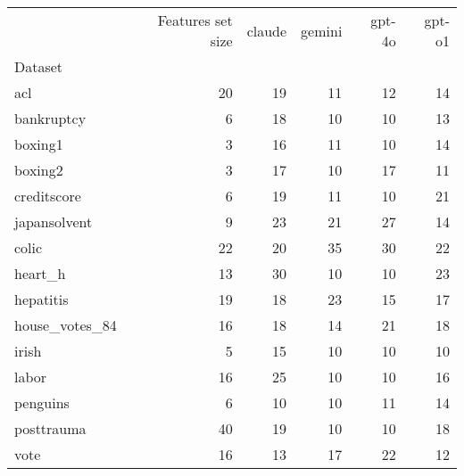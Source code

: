 \begin{tabular}{lrrrrr}
\toprule
 & Features set size & claude & gemini & gpt-4o & gpt-o1 \\
Dataset &  &  &  &  &  \\
\midrule
acl & 20 & 19 & 11 & 12 & 14 \\
bankruptcy & 6 & 18 & 10 & 10 & 13 \\
boxing1 & 3 & 16 & 11 & 10 & 14 \\
boxing2 & 3 & 17 & 10 & 17 & 11 \\
creditscore & 6 & 19 & 11 & 10 & 21 \\
japansolvent & 9 & 23 & 21 & 27 & 14 \\
colic & 22 & 20 & 35 & 30 & 22 \\
heart\_h & 13 & 30 & 10 & 10 & 23 \\
hepatitis & 19 & 18 & 23 & 15 & 17 \\
house\_votes\_84 & 16 & 18 & 14 & 21 & 18 \\
irish & 5 & 15 & 10 & 10 & 10 \\
labor & 16 & 25 & 10 & 10 & 16 \\
penguins & 6 & 10 & 10 & 11 & 14 \\
posttrauma & 40 & 19 & 10 & 10 & 18 \\
vote & 16 & 13 & 17 & 22 & 12 \\
\bottomrule
\end{tabular}
